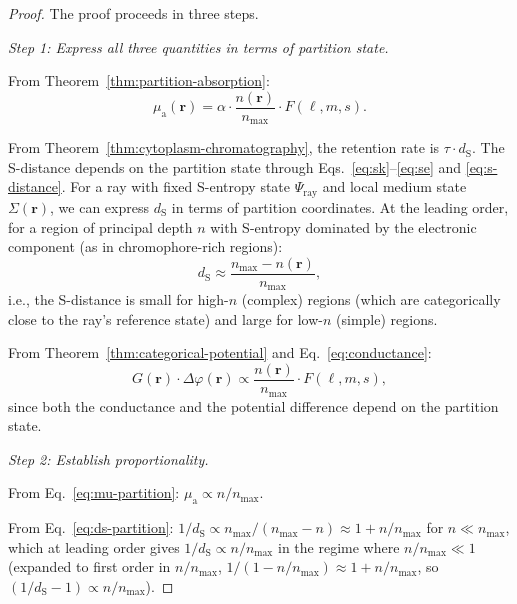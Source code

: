 \documentclass[11pt,twocolumn,a4paper]{article}
\newcommand{\dS}{d_{\mathrm{S}}}
\newcommand{\muabs}{\mu_{\mathrm{a}}}
\begin{document}
\begin{proof}
The proof proceeds in three steps.

\textit{Step 1: Express all three quantities in terms of partition state.}

From Theorem~\ref{thm:partition-absorption}:
\begin{equation}
\muabs(\mathbf{r}) = \alpha \cdot \frac{n(\mathbf{r})}{n_{\max}}
  \cdot F(\ell, m, s).
\label{eq:mu-partition}
\end{equation}

From Theorem~\ref{thm:cytoplasm-chromatography}, the retention rate is
$\tau \cdot \dS$. The S-distance depends on the partition state through
Eqs.~\eqref{eq:sk}--\eqref{eq:se} and \eqref{eq:s-distance}. For a
ray with fixed S-entropy state $\Psi_{\mathrm{ray}}$ and local medium
state $\Sigma(\mathbf{r})$, we can express $\dS$ in terms of partition
coordinates. At the leading order, for a region of principal depth $n$
with S-entropy dominated by the electronic component
(as in chromophore-rich regions):
\begin{equation}
\dS \approx \frac{n_{\max} - n(\mathbf{r})}{n_{\max}},
\label{eq:ds-partition}
\end{equation}
i.e., the S-distance is small for high-$n$ (complex) regions (which
are categorically close to the ray's reference state) and large for
low-$n$ (simple) regions.

From Theorem~\ref{thm:categorical-potential} and
Eq.~\eqref{eq:conductance}:
\begin{equation}
G(\mathbf{r}) \cdot \Delta\varphi(\mathbf{r})
  \propto \frac{n(\mathbf{r})}{n_{\max}} \cdot F(\ell, m, s),
\label{eq:g-partition}
\end{equation}
since both the conductance and the potential difference depend on the
partition state.

\textit{Step 2: Establish proportionality.}

From Eq.~\eqref{eq:mu-partition}: $\muabs \propto n/n_{\max}$.

From Eq.~\eqref{eq:ds-partition}: $1/\dS \propto n_{\max}/(n_{\max} -
n) \approx 1 + n/n_{\max}$ for $n \ll n_{\max}$, which at leading
order gives $1/\dS \propto n/n_{\max}$ in the regime where
$n/n_{\max} \ll 1$ (expanded to first order in $n/n_{\max}$,
$1/(1 - n/n_{\max}) \approx 1 + n/n_{\max}$, so $(1/\dS - 1)
\propto n/n_{\max}$).


\end{proof}
\end{document}
